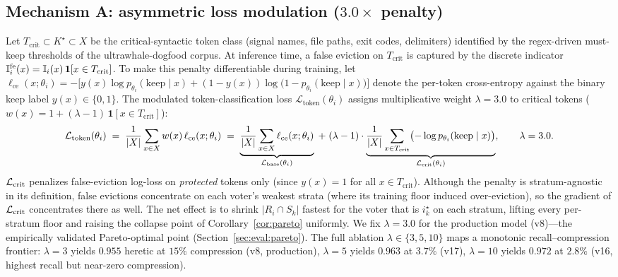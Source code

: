 \subsection{Mechanism A: asymmetric loss modulation ($3.0\times$ penalty)}
\label{sec:loss}

Let $T_{\mathrm{crit}} \subset K^{\star} \subset X$ be the critical-syntactic
token class (signal names, file paths, exit codes, delimiters) identified by
the regex-driven must-keep thresholds of the ultrawhale-dogfood corpus. At
inference time, a false eviction on $T_{\mathrm{crit}}$ is captured by the
discrete indicator
$\mathbb{I}^{\mathrm{fe}}_i(x) = \mathbb{I}_i(x)\,\mathbf{1}[x \in T_{\mathrm{crit}}]$. To make
this penalty differentiable during training, let
$\ell_{\mathrm{ce}}(x;\theta_i) = -\bigl[y(x)\log p_{\theta_i}(\text{keep}\mid x)
+ (1-y(x))\log\bigl(1-p_{\theta_i}(\text{keep}\mid x)\bigr)\bigr]$ denote the
per-token cross-entropy against the binary keep label $y(x)\in\{0,1\}$. The
modulated token-classification loss $\mathcal{L}_{\mathrm{token}}(\theta_i)$
assigns multiplicative weight $\lambda = 3.0$ to critical tokens
($w(x) = 1 + (\lambda - 1)\,\mathbf{1}[x \in T_{\mathrm{crit}}]$):
\[
  \mathcal{L}_{\mathrm{token}}(\theta_i)
  \;=\;
  \frac{1}{|X|}\sum_{x\in X} w(x)\,\ell_{\mathrm{ce}}(x;\theta_i)
  \;=\;
  \underbrace{\frac{1}{|X|}\sum_{x\in X} \ell_{\mathrm{ce}}(x;\theta_i)}_{\mathcal{L}_{\mathrm{base}}(\theta_i)}
  \;+\;
  (\lambda - 1)\cdot
  \underbrace{\frac{1}{|X|}\sum_{x \in T_{\mathrm{crit}}}
              \bigl(-\log p_{\theta_i}(\text{keep}\mid x)\bigr)}_{\mathcal{L}_{\mathrm{crit}}(\theta_i)},
  \qquad \lambda = 3.0.
\]
$\mathcal{L}_{\mathrm{crit}}$ penalizes false-eviction log-loss on \emph{protected} tokens only
(since $y(x)=1$ for all $x\in T_{\mathrm{crit}}$). Although
the penalty is stratum-agnostic in its definition, false evictions concentrate
on each voter's weakest strata (where its training floor induced
over-eviction), so the gradient of $\mathcal{L}_{\mathrm{crit}}$ concentrates there as well. The
net effect is to shrink $|R_i \cap S_k|$ fastest for the voter that is
$i^{\star}_k$ on each stratum, lifting every per-stratum floor and raising the
collapse point of Corollary~\ref{cor:pareto} uniformly. We fix $\lambda=3.0$
for the production model (v8)---the empirically validated Pareto-optimal
point (Section~\ref{sec:eval:pareto}). The full ablation
$\lambda\in\{3,5,10\}$ maps a monotonic recall--compression frontier:
$\lambda{=}3$ yields $0.955$ heretic at $15\%$ compression (v8, production),
$\lambda{=}5$ yields $0.963$ at $3.7\%$ (v17), $\lambda{=}10$ yields $0.972$
at $2.8\%$ (v16, highest recall but near-zero compression).

